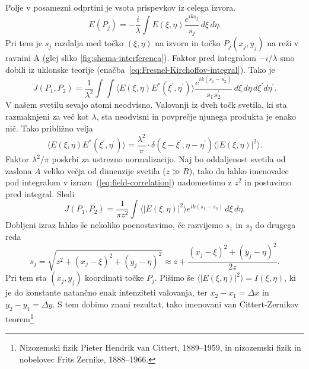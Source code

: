Polje v posamezni odprtini je vsota prispevkov iz celega izvora.
\begin{equation}
E(P_{j})=-\frac{i}{\lambda}\int E(\xi,\eta)\frac{e^{iks_{j}}}{s_{j}}\, d\xi\, d\eta.
\end{equation}
Pri tem je $s_{j}$ razdalja med točko $(\xi,\eta)$ na izvoru in točko
$P_{j}(x_{j},y_{j})$ na reži v ravnini A (glej sliko \ref{fig:shema-interferenca}).
Faktor pred integralom $-i/\lambda$ smo dobili iz uklonske teorije (enačba~\ref{eq:Fresnel-Kirchoffov-integral}).
Tako je 
\begin{equation}
J(P_{1},P_{2})=\frac{1}{\lambda^{2}}\int\int\langle E(\xi,\eta)E^{*}(\xi^{\prime},\eta^{\prime})\rangle\frac{e^{ik(s_{1}-s_{2}^{\prime})}}{s_{1}s_{2}^{\prime}}\, d\xi\, d\eta\, d\xi^{\prime}d\eta^{\prime}.\label{eq:field-correlation}
\end{equation}
V našem svetilu sevajo atomi neodvisno. Valovanji iz dveh točk svetila,
ki sta razmaknjeni za več kot $\lambda$, sta neodvisni in povprečje
njunega produkta je enako nič. Tako približno velja 
\begin{equation}
\langle E(\xi,\eta)E^{*}(\xi^{\prime},\eta^{\prime})\rangle=\frac{\lambda^{2}}{\pi} \cdot \delta(\xi-\xi^{\prime},\eta-\eta^{\prime})\langle|E(\xi,\eta)|^{2}\rangle.
\label{eq:delta-Zernike}
\end{equation}
Faktor $\lambda^{2}/\pi$ poskrbi za ustrezno normalizacijo. 
Naj bo oddaljenost svetila od zaslona $A$
veliko večja od dimenzije svetila ($z\gg R$), tako da lahko imenovalec pod integralom
v izrazu~(\ref{eq:field-correlation}) nadomestimo z $z^{2}$ in postavimo
pred integral. Sledi
\begin{equation}
J(P_{1},P_{2})=\frac{1}{\pi z^{2}}\int\langle|E(\xi,\eta)|^{2}\rangle e^{ik(s_{1}-s_{2})}\, d\xi\, d\eta.\label{eq:Zernike1}
\end{equation}
Dobljeni izraz lahko še nekoliko poenostavimo, če razvijemo $s_{1}$
in $s_{2}$ do drugega reda
\begin{equation}
s_{j}=\sqrt{z^{2}+(x_{j}-\xi)^{2}+(y_{j}-\eta)^{2}}\approx z+\frac{(x_{j}-\xi)^{2}+(y_{j}-\eta)^{2}}{2z}.
\end{equation}
Pri tem sta $(x_{j},y_{j})$ koordinati točke $P_{j}$. Pišimo 
še $\langle|E(\xi,\eta)|^{2}\rangle=I(\xi,\eta)$, ki je do konstante natančno
enak intenziteti valovanja, ter $x_{2}-x_{1}=\Delta x$
in $y_{2}-y_{1}=\Delta y$. S tem dobimo znani rezultat, tako imenovani 
van Cittert-Zernikov teorem\footnote{Nizozemski fizik Pieter Hendrik van Cittert, 1889--1959, in 
nizozemski fizik in nobelovec Frits Zernike, 1888--1966.}

